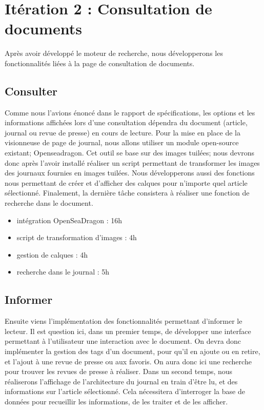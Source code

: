 \section{Itération 2 : Consultation de documents}
	Après avoir développé le moteur de recherche, nous développerons les fonctionnalités liées à la page de consultation de documents.

	\subsection{Consulter}
		Comme nous l'avions énoncé dans le rapport de spécifications, les options et les informations affichées lors d'une consultation dépendra du document (article, journal ou revue de presse) en cours de lecture.
		Pour la mise en place de la visionneuse de page de journal, nous allons utiliser un module open-source existant; Openseadragon. Cet outil se base sur des images tuilées; nous devrons donc après l'avoir installé réaliser un script permettant de transformer les images des journaux fournies en images tuilées. Nous développerons aussi des fonctions nous permettant de créer et d'afficher des calques pour n'importe quel article sélectionné. Finalement, la dernière tâche consistera à réaliser une fonction de recherche dans le document.

		\begin{itemize}
			\item intégration OpenSeaDragon : 16h
			\item script de transformation d'images : 4h
			\item gestion de calques : 4h
			\item recherche dans le journal : 5h
		\end{itemize}


	\subsection{Informer}
		Ensuite viens l'implémentation des fonctionnalités permettant d'informer le lecteur. Il est question ici, dans un premier temps, de développer une interface permettant à l'utilisateur une interaction avec le document. On devra donc implémenter la gestion des tags d'un document, pour qu'il en ajoute ou en retire, et l'ajout à une revue de presse ou aux favoris. On aura donc ici une recherche pour trouver les revues de presse à réaliser. Dans un second temps, nous réaliserons l'affichage de l'architecture du journal en train d'être lu, et des informations sur l'article sélectionné. Cela nécessitera d'interroger la base de données pour recueillir les informations, de les traiter et de les afficher.

